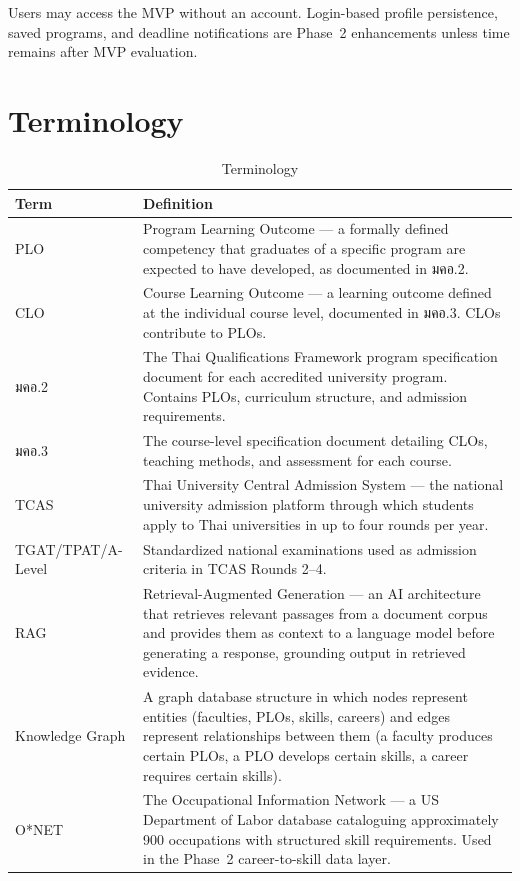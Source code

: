 Users may access the MVP without an account. Login-based profile persistence, saved programs, and deadline notifications are Phase~2 enhancements unless time remains after MVP evaluation.

\section{Terminology}
\label{section:terminology}

\begin{table}[htbp]
\centering
\small
\renewcommand{\arraystretch}{1.4}
\caption{Terminology}
\begin{tabularx}{\textwidth}{|L{3cm}|Y|}
\hline
\textbf{Term} & \textbf{Definition} \\
\hline
PLO & Program Learning Outcome --- a formally defined competency that graduates of a specific program are expected to have developed, as documented in มคอ.2. \\
\hline
CLO & Course Learning Outcome --- a learning outcome defined at the individual course level, documented in มคอ.3. CLOs contribute to PLOs. \\
\hline
มคอ.2 & The Thai Qualifications Framework program specification document for each accredited university program. Contains PLOs, curriculum structure, and admission requirements. \\
\hline
มคอ.3 & The course-level specification document detailing CLOs, teaching methods, and assessment for each course. \\
\hline
TCAS & Thai University Central Admission System --- the national university admission platform through which students apply to Thai universities in up to four rounds per year. \\
\hline
TGAT/TPAT/A-Level & Standardized national examinations used as admission criteria in TCAS Rounds 2--4. \\
\hline
RAG & Retrieval-Augmented Generation --- an AI architecture that retrieves relevant passages from a document corpus and provides them as context to a language model before generating a response, grounding output in retrieved evidence. \\
\hline
Knowledge Graph & A graph database structure in which nodes represent entities (faculties, PLOs, skills, careers) and edges represent relationships between them (a faculty produces certain PLOs, a PLO develops certain skills, a career requires certain skills). \\
\hline
O*NET & The Occupational Information Network --- a US Department of Labor database cataloguing approximately 900 occupations with structured skill requirements. Used in the Phase~2 career-to-skill data layer. \\

\end{tabularx}
\end{table}
